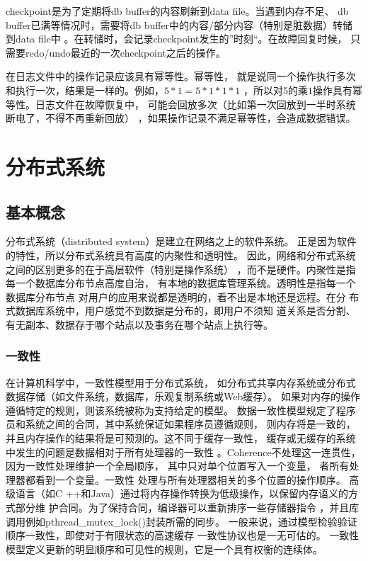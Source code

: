 checkpoint是为了定期将db buffer的内容刷新到data file。当遇到内存不足、
db buffer已满等情况时，需要将db buffer中的内容/部分内容（特别是脏数据）转储到data file中
。在转储时，会记录checkpoint发生的”时刻“。在故障回复时候，
只需要redo/undo最近的一次checkpoint之后的操作。

在日志文件中的操作记录应该具有幂等性。幂等性，
就是说同一个操作执行多次和执行一次，结果是一样的。例如$ ，5*1 = 5*1*1*1 $
，所以对5$  $的乘$ 1 $操作具有幂等性。日志文件在故障恢复中，
可能会回放多次（比如第一次回放到一半时系统断电了，不得不再重新回放）
，如果操作记录不满足幂等性，会造成数据错误。
\section{分布式系统}
\subsection{基本概念}
分布式系统（distributed system）是建立在网络之上的软件系统。
正是因为软件的特性，所以分布式系统具有高度的内聚性和透明性。
因此，网络和分布式系统之间的区别更多的在于高层软件（特别是操作系统）
，而不是硬件。内聚性是指每一个数据库分布节点高度自治，
有本地的数据库管理系统。透明性是指每一个数据库分布节点
对用户的应用来说都是透明的，看不出是本地还是远程。在分
布式数据库系统中，用户感觉不到数据是分布的，即用户不须知
道关系是否分割、有无副本、数据存于哪个站点以及事务在哪个站点上执行等。
\subsubsection{一致性}
在计算机科学中，一致性模型用于分布式系统，
如分布式共享内存系统或分布式数据存储（如文件系统，数据库，乐观复制系统或Web缓存）。
如果对内存的操作遵循特定的规则，则该系统被称为支持给定的模型。
数据一致性模型规定了程序员和系统之间的合同，其中系统保证如果程序员遵循规则，
则内存将是一致的，并且内存操作的结果将是可预测的。这不同于缓存一致性，
缓存或无缓存的系统中发生的问题是数据相对于所有处理器的一致性
。Coherence不处理这一连贯性，
因为一致性处理维护一个全局顺序，
其中只对单个位置写入一个变量，
者所有处理器都看到一个变量。一致性
处理与所有处理器相关的多个位置的操作顺序。
高级语言（如C ++和Java）通过将内存操作转换为低级操作，以保留内存语义的方式部分维
护合同。为了保持合同，编译器可以重新排序一些存储器指令
，并且库调用例如pthread\_mutex\_lock()封装所需的同步。
一般来说，通过模型检验验证顺序一致性，即使对于有限状态的高速缓存
一致性协议也是一无可估的。
一致性模型定义更新的明显顺序和可见性的规则，它是一个具有权衡的连续体。


